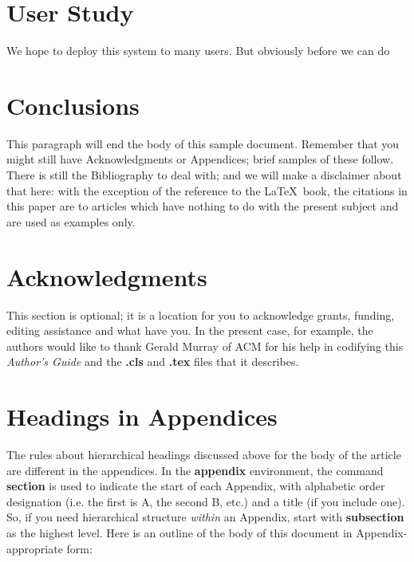 \documentclass{sig-alternate-05-2015}
\begin{document}
\section{User Study}
We hope to deploy this system to many users. But obviously before we can do

\section{Conclusions}
This paragraph will end the body of this sample document.
Remember that you might still have Acknowledgments or
Appendices; brief samples of these
follow.  There is still the Bibliography to deal with; and
we will make a disclaimer about that here: with the exception
of the reference to the \LaTeX\ book, the citations in
this paper are to articles which have nothing to
do with the present subject and are used as
examples only.

\section{Acknowledgments}
This section is optional; it is a location for you
to acknowledge grants, funding, editing assistance and
what have you.  In the present case, for example, the
authors would like to thank Gerald Murray of ACM for
his help in codifying this \textit{Author's Guide}
and the \textbf{.cls} and \textbf{.tex} files that it describes.

%

%
%
\appendix
\section{Headings in Appendices}
The rules about hierarchical headings discussed above for
the body of the article are different in the appendices.
In the \textbf{appendix} environment, the command
\textbf{section} is used to
indicate the start of each Appendix, with alphabetic order
designation (i.e. the first is A, the second B, etc.) and
a title (if you include one).  So, if you need
hierarchical structure
\textit{within} an Appendix, start with \textbf{subsection} as the
highest level. Here is an outline of the body of this
document in Appendix-appropriate form:
\end{document}

